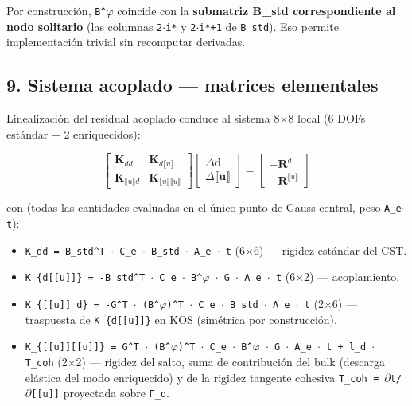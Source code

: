 \documentclass[11pt,letterpaper,oneside]{report}
\begin{document}
Por construcción, \texttt{B\textasciicircum{}\ensuremath{\varphi}} coincide con la \textbf{submatriz B\_std correspondiente al nodo solitario} (las columnas \texttt{2\ensuremath{\cdot}i*} y \texttt{2\ensuremath{\cdot}i*+1} de \texttt{B\_std}). Eso permite implementación trivial sin recomputar derivadas.

\subsection{9. Sistema acoplado --- matrices elementales}

Linealización del residual acoplado conduce al sistema 8\ensuremath{\times}8 local (6 DOFs estándar + 2 enriquecidos):

\[
\begin{bmatrix} \mathbf K_{dd} & \mathbf K_{d\llbracket u\rrbracket} \\ \mathbf K_{\llbracket u\rrbracket d} & \mathbf K_{\llbracket u\rrbracket\llbracket u\rrbracket} \end{bmatrix} \begin{bmatrix} \Delta\mathbf d \\ \Delta\llbracket\mathbf u\rrbracket \end{bmatrix} = \begin{bmatrix} -\mathbf R^d \\ -\mathbf R^{\llbracket u\rrbracket} \end{bmatrix}
\]

con (todas las cantidades evaluadas en el único punto de Gauss central, peso \texttt{A\_e\ensuremath{\cdot}t}):

\begin{itemize}
  \item \texttt{K\_dd = B\_std\textasciicircum{}T \ensuremath{\cdot} C\_e \ensuremath{\cdot} B\_std \ensuremath{\cdot} A\_e \ensuremath{\cdot} t} (6\ensuremath{\times}6) --- rigidez estándar del CST.
  \item \texttt{K\_\{d[[u]]\} = -B\_std\textasciicircum{}T \ensuremath{\cdot} C\_e \ensuremath{\cdot} B\textasciicircum{}\ensuremath{\varphi} \ensuremath{\cdot} G \ensuremath{\cdot} A\_e \ensuremath{\cdot} t} (6\ensuremath{\times}2) --- acoplamiento.
  \item \texttt{K\_\{[[u]] d\} = -G\textasciicircum{}T \ensuremath{\cdot} (B\textasciicircum{}\ensuremath{\varphi})\textasciicircum{}T \ensuremath{\cdot} C\_e \ensuremath{\cdot} B\_std \ensuremath{\cdot} A\_e \ensuremath{\cdot} t} (2\ensuremath{\times}6) --- traspuesta de \texttt{K\_\{d[[u]]\}} en KOS (simétrica por construcción).
  \item \texttt{K\_\{[[u]][[u]]\} = G\textasciicircum{}T \ensuremath{\cdot} (B\textasciicircum{}\ensuremath{\varphi})\textasciicircum{}T \ensuremath{\cdot} C\_e \ensuremath{\cdot} B\textasciicircum{}\ensuremath{\varphi} \ensuremath{\cdot} G \ensuremath{\cdot} A\_e \ensuremath{\cdot} t + l\_d \ensuremath{\cdot} T\_coh} (2\ensuremath{\times}2) --- rigidez del salto, suma de contribución del bulk (descarga elástica del modo enriquecido) y de la rigidez tangente cohesiva \texttt{T\_coh ≡ \ensuremath{\partial}t/\ensuremath{\partial}[[u]]} proyectada sobre \texttt{Γ\_d}.
\end{itemize}
\end{document}
